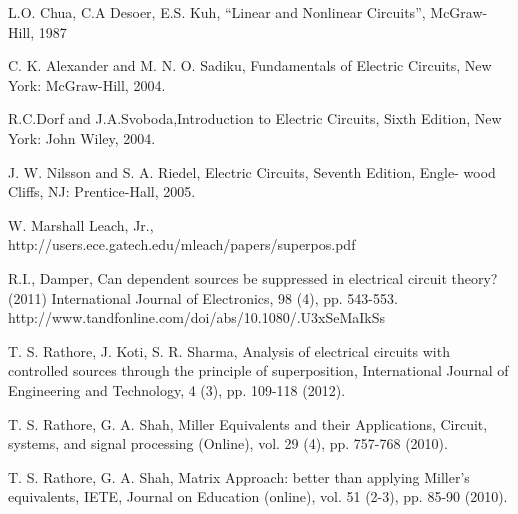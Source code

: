 \documentclass[10pt]{amsart}
\begin{document}
\begin{thebibliography}{1}
 L.O. Chua, C.A Desoer, E.S. Kuh, ``Linear and Nonlinear Circuits'', McGraw-Hill, 1987

 C. K. Alexander and M. N. O. Sadiku, Fundamentals of Electric Circuits, New York: McGraw-Hill, 2004.

 R.C.Dorf and J.A.Svoboda,Introduction to  Electric Circuits, Sixth Edition, New York: John Wiley, 2004.

 J. W. Nilsson and S. A. Riedel, Electric Circuits, Seventh Edition, Engle- wood Cliffs, NJ: Prentice-Hall, 2005.

 W. Marshall Leach, Jr., \\
 {\color{blue}\textsf{http://users.ece.gatech.edu/mleach/papers/superpos.pdf}}

 R.I., Damper, Can dependent sources be suppressed in electrical circuit theory?
(2011) International Journal of Electronics, 98 (4), pp. 543-553. \\
{\color{blue}\textsf{ http://www.tandfonline.com/doi/abs/10.1080/.U3xSeMaIkSs}}

 T. S. Rathore, J. Koti, S. R. Sharma,  Analysis of electrical circuits with controlled sources through the principle of superposition, International Journal of Engineering and Technology, 4 (3), pp. 109-118 (2012). 

 T. S. Rathore, G. A. Shah, Miller Equivalents and their Applications, Circuit, systems, and signal processing (Online), vol. 29 (4), pp. 757-768 (2010).

 T. S. Rathore, G. A. Shah, Matrix Approach: better than applying Miller's equivalents, IETE, Journal on Education (online), vol. 51 (2-3), pp. 85-90 (2010).

\end{thebibliography}
\end{document}
